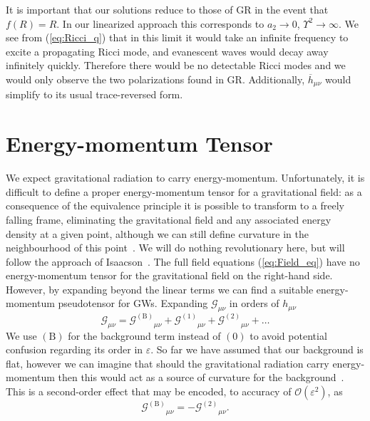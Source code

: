 \documentclass[aps,prd,amsfonts,amssymb,amsmath,nofootinbib,reprint,showpacs]{revtex4-1}
\newcommand{\eqnref}[1]{(\ref{eq:#1})}
\newcommand{\order}[1]{\ensuremath{\mathcal{O}({#1})}}
\begin{document}
It is important that our solutions reduce to those of GR in the event that $f(R) = R$. In our linearized approach this corresponds to $a_2 \rightarrow 0$, $\Upsilon^2 \rightarrow \infty$. We see from \eqnref{Ricci_q} that in this limit it would take an infinite frequency to excite a propagating Ricci mode, and evanescent waves would decay away infinitely quickly. Therefore there would be no detectable Ricci modes and we would only observe the two polarizations found in GR. Additionally, $\overline{h}_{\mu\nu}$ would simplify to its usual trace-reversed form.

\section{Energy-momentum Tensor\label{sec:EM_tensor}}

We expect gravitational radiation to carry energy-momentum. Unfortunately, it is difficult to define a proper energy-momentum tensor for a gravitational field: as a consequence of the equivalence principle it is possible to transform to a freely falling frame, eliminating the gravitational field and any associated energy density at a given point, although we can still define curvature in the neighbourhood of this point~\cite{Misner1973, Hobson2006}. We will do nothing revolutionary here, but will follow the approach of Isaacson~\cite{Isaacson1968, Isaacson1968a}. The full field equations \eqnref{Field_eq} have no energy-momentum tensor for the gravitational field on the right-hand side. However, by expanding beyond the linear terms we can find a suitable energy-momentum pseudotensor for GWs. Expanding $\mathcal{G}_{\mu\nu}$ in orders of $h_{\mu\nu}$
\begin{equation}
\mathcal{G}_{\mu\nu} = {\mathcal{G}^{(\text{B})}}_{\mu\nu} + {\mathcal{G}^{(1)}}_{\mu\nu} + {\mathcal{G}^{(2)}}_{\mu\nu} + \ldots
\label{eq:G_exp}
\end{equation}
We use $(\text{B})$ for the background term instead of $(0)$ to avoid potential confusion regarding its order in $\varepsilon$. So far we have assumed that our background is flat, however we can imagine that should the gravitational radiation carry energy-momentum then this would act as a source of curvature for the background~\cite{Wald1984}. This is a second-order effect that may be encoded, to accuracy of $\order{\varepsilon^2}$, as
\begin{equation}
{\mathcal{G}^{(\text{B})}}_{\mu\nu} = -{\mathcal{G}^{(2)}}_{\mu\nu}.
\end{equation}
\end{document}
